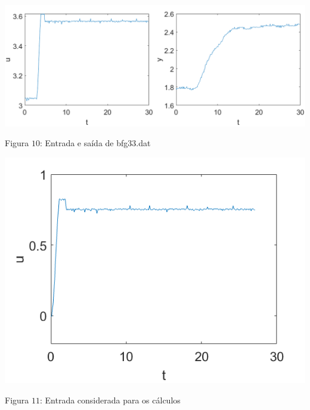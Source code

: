 \documentclass{rbfin}
\begin{document}
\begin{center}
\includegraphics[scale=0.65]{33_1}

Figura $10$: Entrada e saída de bfg33.dat
\end{center}

\begin{center}
\includegraphics[scale=0.65]{33_3}

Figura $11$: Entrada considerada para os cálculos
\end{center}
\end{document}
